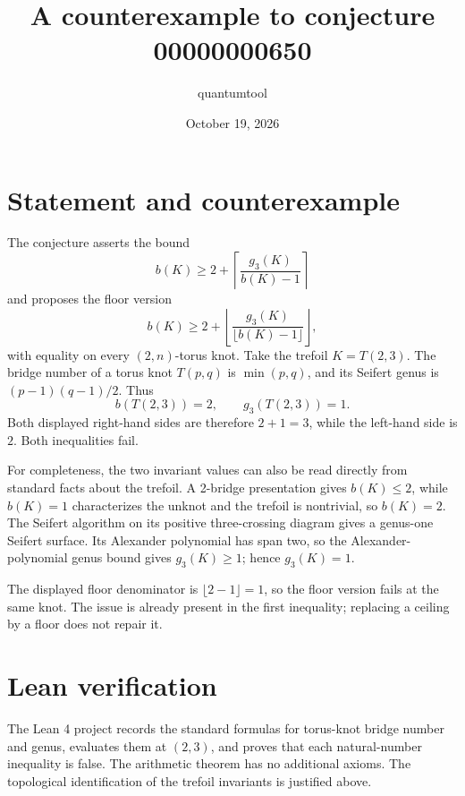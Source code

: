 \documentclass[11pt]{article}
\title{A counterexample to conjecture 00000000650}
\author{quantumtool}
\date{October 19, 2026}
\begin{document}
\maketitle

\section*{Statement and counterexample}
The conjecture asserts the bound
\[
 b(K)\ge 2+\left\lceil\frac{g_3(K)}{b(K)-1}\right\rceil
\]
and proposes the floor version
\[
 b(K)\ge 2+\left\lfloor\frac{g_3(K)}{\lfloor b(K)-1\rfloor}\right\rfloor,
\]
with equality on every $(2,n)$-torus knot.  Take the trefoil $K=T(2,3)$.
The bridge number of a torus knot $T(p,q)$ is $\min(p,q)$, and its Seifert genus is $(p-1)(q-1)/2$. Thus
\[
 b(T(2,3))=2,\qquad g_3(T(2,3))=1.
\]
Both displayed right-hand sides are therefore $2+1=3$, while the left-hand side is $2$. Both inequalities fail.

For completeness, the two invariant values can also be read directly from standard facts about the trefoil. A 2-bridge presentation gives $b(K)\le2$, while $b(K)=1$ characterizes the unknot and the trefoil is nontrivial, so $b(K)=2$. The Seifert algorithm on its positive three-crossing diagram gives a genus-one Seifert surface. Its Alexander polynomial has span two, so the Alexander-polynomial genus bound gives $g_3(K)\ge1$; hence $g_3(K)=1$.

The displayed floor denominator is $\lfloor 2-1\rfloor=1$, so the floor version fails at the same knot. The issue is already present in the first inequality; replacing a ceiling by a floor does not repair it.

\section*{Lean verification}
The Lean 4 project records the standard formulas for torus-knot bridge number and genus, evaluates them at $(2,3)$, and proves that each natural-number inequality is false. The arithmetic theorem has no additional axioms. The topological identification of the trefoil invariants is justified above.
\end{document}
